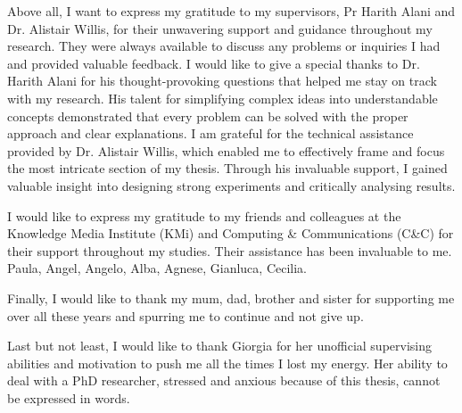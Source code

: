 Above all, I want to express my gratitude to my supervisors, Pr Harith Alani and Dr. Alistair Willis, for their unwavering support and guidance throughout my research. They were always available to discuss any problems or inquiries I had and provided valuable feedback.
I would like to give a special thanks to Dr. Harith Alani for his thought-provoking questions that helped me stay on track with my research. His talent for simplifying complex ideas into understandable concepts demonstrated that every problem can be solved with the proper approach and clear explanations.
I am grateful for the technical assistance provided by Dr. Alistair Willis, which enabled me to effectively frame and focus the most intricate section of my thesis. Through his invaluable support, I gained valuable insight into designing strong experiments and critically analysing results.


I would like to express my gratitude to my friends and colleagues at the Knowledge Media Institute (KMi) and Computing \& Communications (C\&C) for their support throughout my studies. Their assistance has been invaluable to me. Paula, Angel, Angelo, Alba, Agnese, Gianluca, Cecilia.

Finally, I would like to thank my mum, dad, brother and sister for supporting me over all these years and spurring me to continue and not give up.

Last but not least, I would like to thank Giorgia for her unofficial supervising abilities and motivation to push me all the times I lost my energy. Her ability to deal with a PhD researcher, stressed and anxious because of this thesis, cannot be expressed in words.
